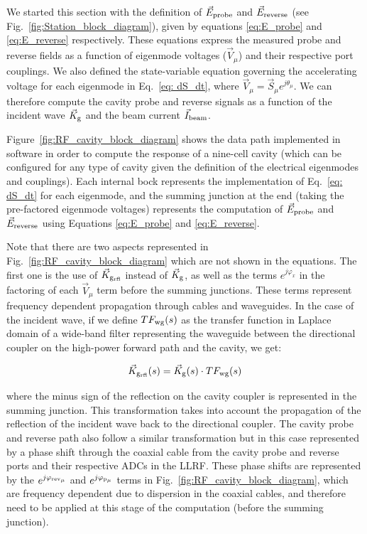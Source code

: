 \documentclass[a4paper,12pt]{article}
\begin{document}
We started this section with the definition of $\vec E_{\rm probe}$ and $\vec E_{\rm reverse}$ (see Fig.~\ref{fig:Station_block_diagram}), given by equations \ref{eq:E_probe} and \ref{eq:E_reverse} respectively. These equations express the measured probe and reverse fields as a function of eigenmode voltages ($\vec V_\mu$) and their respective port couplings. We also defined the state-variable equation governing the accelerating voltage for each eigenmode in Eq.~\ref{eq: dS_dt}, where $\vec{V}_{\mu} = \vec{S}_{\mu}e^{j\theta_{\mu}}$. We can therefore compute the cavity probe and reverse signals as a function of the incident wave $\vec K_{\rm g}$ and the beam current $\vec I_{\rm beam}$.

Figure~\ref{fig:RF_cavity_block_diagram} shows the data path implemented in software in order to compute the response of a nine-cell cavity (which can be configured for any type of cavity given the definition of the electrical eigenmodes and couplings). Each internal bock represents the implementation of Eq.~\ref{eq: dS_dt} for each eigenmode, and the summing junction at the end (taking the pre-factored eigenmode voltages) represents the computation of $\vec E_{\rm probe}$ and $\vec E_{\rm reverse}$ using Equations \ref{eq:E_probe} and \ref{eq:E_reverse}.

Note that there are two aspects represented in Fig.~\ref{fig:RF_cavity_block_diagram} which are not shown in the equations. The first one is the use of $\vec K_{\rm g_{rfl}}$ instead of $\vec K_{\rm g}$, as well as the terms $e^{j\varphi_{x}}$ in the factoring of each $\vec V_\mu$ term before the summing junctions. These terms represent frequency dependent propagation through cables and waveguides. In the case of the incident wave, if we define $TF_{\rm wg}(s)$ as the transfer function in Laplace domain of a wide-band filter representing the waveguide between the directional coupler on the high-power forward path and the cavity, we get:

\begin{equation}
 \vec K_{\rm g_{rfl}}(s) = \vec K_{\rm g}(s) \cdot TF_{\rm wg}(s)
\end{equation}

\noindent where the minus sign of the reflection on the cavity coupler is represented in the summing junction. This transformation takes into account the propagation of the reflection of the incident wave back to the directional coupler.
The cavity probe and reverse path also follow a similar transformation but in this case represented by a phase shift through the coaxial cable from the cavity probe and reverse ports and their respective ADCs in the LLRF. These phase shifts are represented by the $e^{j\varphi_{\rm rev_{\mu}}}$ and $e^{j\varphi_{\rm p_{\mu}}}$ terms in Fig.~\ref{fig:RF_cavity_block_diagram}, which are frequency dependent due to dispersion in the coaxial cables, and therefore need to be applied at this stage of the computation (before the summing junction).
\end{document}
